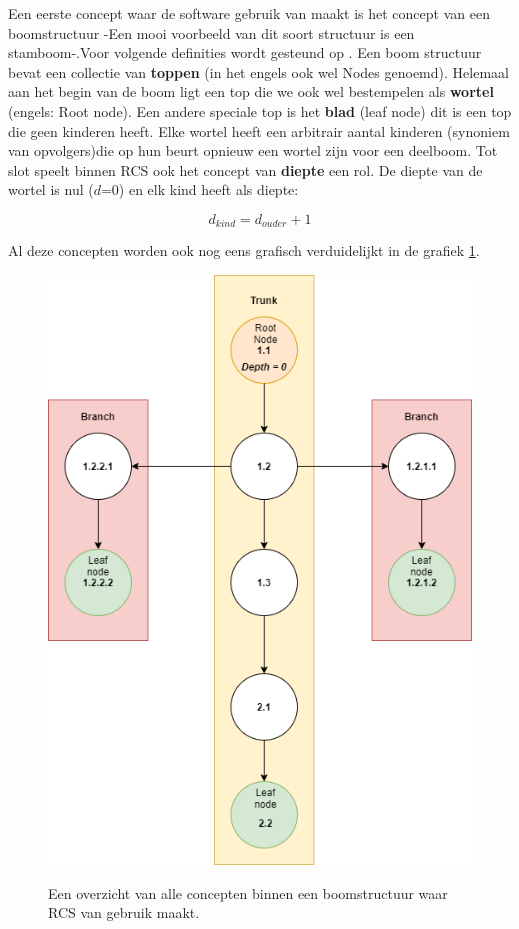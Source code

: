 Een eerste concept waar de software gebruik van maakt is het concept van een boomstructuur -Een mooi voorbeeld van dit soort structuur is een stamboom-.Voor volgende definities wordt gesteund op \textcite{Lievens2019}. Een boom structuur bevat een collectie van \textbf{toppen} (in het engels ook wel Nodes genoemd). Helemaal aan het begin van de boom ligt een top die we ook wel bestempelen als \textbf{wortel} (engels: Root node). Een andere speciale top is het \textbf{blad} (leaf node) dit is een top die geen kinderen heeft. Elke wortel heeft een arbitrair aantal kinderen (synoniem van opvolgers)die op hun beurt opnieuw een wortel zijn voor een deelboom. Tot slot speelt binnen RCS ook het concept van \textbf{diepte} een rol. De diepte van de wortel is nul ($d$=0) en elk kind heeft als diepte: 

\begin{equation}
	d_{kind} = d_{ouder} + 1
\end{equation}

Al deze concepten worden ook nog eens grafisch verduidelijkt in de grafiek \ref{fig:tree1}.

\begin{figure}
\centering
  	\includegraphics[scale=0.5]{tree1.png}
	\label{fig:tree1}
\caption[Overzicht concepten boomstructuur]{Een overzicht van alle concepten binnen een boomstructuur waar RCS van gebruik maakt.}
\end{figure}
